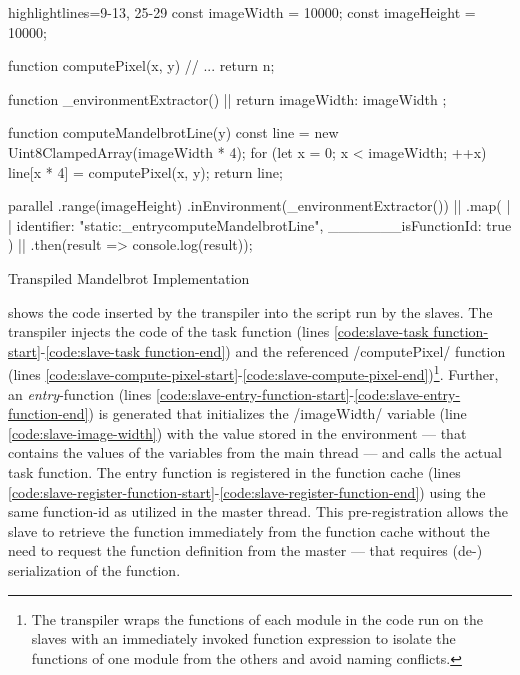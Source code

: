 \begin{listing}
	\begin{javascriptcode*}{highlightlines={9-13, 25-29}}
const imageWidth = 10000;
const imageHeight = 10000;

function computePixel(x, y) {
	// ...
	return n;
}

function _environmentExtractor() { |$\label{code:mandelbrot-environment-extractor}$|
	return {
		imageWidth: imageWidth
	};
}

function computeMandelbrotLine(y) {
	const line = new Uint8ClampedArray(imageWidth * 4);
	for (let x = 0; x < imageWidth; ++x) {
		line[x * 4] = computePixel(x, y);
	}
	return line;
}

parallel
	.range(imageHeight)
	.inEnvironment(_environmentExtractor()) |$\label{code:mandelbrot-environment-call}$|
	.map({ |$\label{code:mandelbrot-function-id-start}$|
		identifier: "static:_entrycomputeMandelbrotLine",
		_______isFunctionId: true
	}) |$\label{code:mandelbrot-function-id-end}$|
	.then(result => console.log(result));
\end{javascriptcode*}
\caption{Transpiled Mandelbrot Implementation}
\label{fig:mandelbrot-transpiled}
\end{listing}


 shows the code inserted by the transpiler into the script run by the slaves. The transpiler injects the code of the task function (lines \ref{code:slave-task function-start}-\ref{code:slave-task function-end}) and the referenced \javascriptinline/computePixel/ function (lines \ref{code:slave-compute-pixel-start}-\ref{code:slave-compute-pixel-end})\footnote{The transpiler wraps the functions of each module in the code run on the slaves with an immediately invoked function expression to isolate the functions of one module from the others and avoid naming conflicts.}. Further, an \textit{entry}-function (lines \ref{code:slave-entry-function-start}-\ref{code:slave-entry-function-end}) is generated that initializes the \javascriptinline/imageWidth/ variable (line \ref{code:slave-image-width}) with the value stored in the environment --- that contains the values of the variables from the main thread --- and calls the actual task function. The entry function is registered in the function cache (lines \ref{code:slave-register-function-start}-\ref{code:slave-register-function-end}) using the same function-id as utilized in the master thread. This pre-registration allows the slave to retrieve the function immediately from the function cache without the need to request the function definition from the master --- that requires (de-) serialization of the function.

